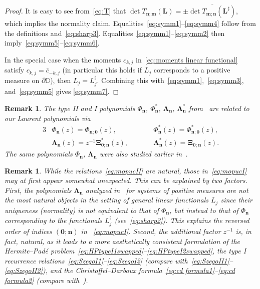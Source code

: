 \documentclass[reqno,centertags,11pt,draft]{amsart}
\newtheorem{rem}[thm]{Remark}
\newcommand{\T}{\mathbb{\partial\mathbb{D}}}
\begin{document}
\begin{proof}
    It is easy to see from~\eqref{eq:T} that $\det T_{\bm{n};\bm{m}}(\bm{L}) = \pm \overline{\det T_{\bm{m};\bm{n}}(\bm{L}^\sharp)}$, which implies the normality claim.  
    Equalities~\eqref{eq:symm1}--\eqref{eq:symm4} follow from the definitions and~\eqref{eq:sharp3}.
    Equalities~\eqref{eq:symm1}--\eqref{eq:symm2} then imply~\eqref{eq:symm5}--\eqref{eq:symm6}. 

    In the special case when the moments $c_{k,j}$ in~\eqref{eq:moments linear functional} satisfy $c_{k,j} = \bar{c}_{-k,j}$ (in particular this holds if $L_j$ corresponds to a positive measure on $\T$), then $L_j = L_j^\sharp$. Combining this with~\eqref{eq:symm1},~\eqref{eq:symm3}, and~\eqref{eq:symm5} gives \eqref{eq:symm7}.
\end{proof}
\begin{rem}\label{rem:annoying1}
    The type II and I polynomials  $\Phi_{\bm{n}}$, $\Phi_{\bm{n}}^*$, $\bm{\Lambda}_{\bm{n}}$, $\bm{\Lambda}_{\bm{n}}^*$ from~\cite{KVMOPUC}  are  related to our Laurent polynomials via
\begin{alignat}{3}
    \label{eq:mopucII}
    &\Phi_{\bm{n}}(z) = \Phi_{\bm{n};\bm{0}}(z),\qquad &&  \Phi_{\bm{n}}^*(z) = \Phi^*_{\bm{n};\bm{0}}(z), \\ 
    \label{eq:mopucI}
    &\bm{\Lambda}_{\bm{n}}(z) = z^{-1} \bm{\Xi}^*_{\bm{0};\bm{n}}(z), \qquad &&  \bm{\Lambda}_{\bm{n}}^*(z) = \bm{\Xi}_{\bm{0};\bm{n}}(z).
\end{alignat}
    The same polynomials $\Phi_{\bm{n}}$, $\bm{\Lambda}_{\bm{n}}$  were also studied earlier in~\cite{MOPUC1,MOPUC2}.
\end{rem}
\begin{rem}\label{rem:annoying2}
    While the relations~\eqref{eq:mopucII} are natural, those in~\eqref{eq:mopucI} may at first appear somewhat unexpected. This can be explained by two factors. First, the polynomials $\bm\Lambda_{\bm{n}}$ analyzed in~\cite{MOPUC1,MOPUC2,KVMOPUC} for systems of positive measures are not the most natural objects in the setting of general linear functionals $L_j$ since their uniqueness  (normality) is {\it not} equivalent to that of $\Phi_{\bm{n}}$, but instead to that of $\Phi_{\bm{n}}$ corresponding to the functionals $L_j^\sharp$ (see~\eqref{eq:sharp2}).
    This explains the reversed order of indices $(\bm{0};\bm{n})$ in ~\eqref{eq:mopucI}. Second, the additional factor $z^{-1}$ is, in fact, natural, as it leads to a more aesthetically consistent formulation of the Hermite--Pad\'{e} problem~\eqref{eq:HPtypeI1swapped}--\eqref{eq:HPtypeI2swapped}, the type I recurrence relations~\eqref{eq:SzegoI1}--\eqref{eq:SzegoI2} (compare with~\eqref{eq:SzegoII1}--\eqref{eq:SzegoII2}), and the Christoffel--Darboux formula~\eqref{eq:cd formula1}--\eqref{eq:cd formula2} (compare with~\cite[Thm 6.1]{KVMOPUC}). 
\end{rem}
\end{document}
